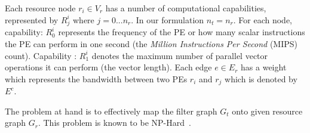 \documentclass[10pt, conference, compsocconf]{IEEEtran}
\begin{document}


Each resource node $r_i \in V_r$ has a number of computational
capabilities, represented by $R^{i}_{j}$ where $j=0...n_r$.
In our formulation $n_t = n_r$.
For each node, capability: $R^i_0$ represents the frequency of the PE or
how many scalar instructions the PE can perform in one second (the
\textit{Million Instructions Per Second} (MIPS) count). Capability :
$R^i_1$ denotes the maximum number of parallel vector operations it can
perform (the vector length). Each edge $e \in E_r$ has a weight which
represents the bandwidth between two PEs $r_i$ and $r_j$ which is
denoted by $E^c$.


The problem at hand is to effectively map the filter graph $G_t$ onto
given resource graph $G_r$. This problem is known to be
NP-Hard~\cite{vsar89}. %

\end{document}
